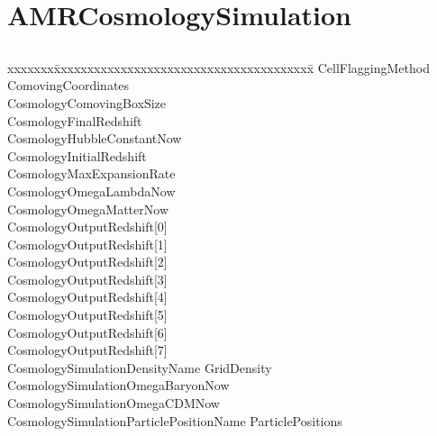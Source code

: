 \documentclass{book}
\begin{document}
\section{AMRCosmologySimulation} \label{s:AMRCosmologySimulation}

\subsection{\enzo}

{\parametersize
\begin{tabbing}
xxxxxxx\=xxxxxxxxxxxxxxxxxxxxxxxxxxxxxxxxxxxxxxx\=\kill
\> CellFlaggingMethod             \\
\> ComovingCoordinates                \\
\> CosmologyComovingBoxSize        \\
\> CosmologyFinalRedshift             \\
\> CosmologyHubbleConstantNow       \\
\> CosmologyInitialRedshift          \\
\> CosmologyMaxExpansionRate      \\
\> CosmologyOmegaLambdaNow     \\
\> CosmologyOmegaMatterNow     \\
\> CosmologyOutputRedshift[0]  \\
\> CosmologyOutputRedshift[1]  \\
\> CosmologyOutputRedshift[2]  \\
\> CosmologyOutputRedshift[3]  \\
\> CosmologyOutputRedshift[4]  \\
\> CosmologyOutputRedshift[5]  \\
\> CosmologyOutputRedshift[6]  \\
\> CosmologyOutputRedshift[7]  \\
\> CosmologySimulationDensityName          \> GridDensity \\
\> CosmologySimulationOmegaBaryonNow        \\
\> CosmologySimulationOmegaCDMNow           \\
\> CosmologySimulationParticlePositionName \> ParticlePositions \\

\end{tabbing}}
\end{document}
